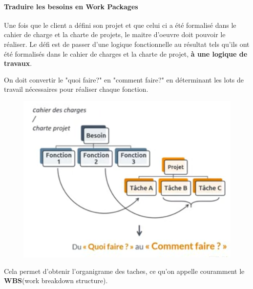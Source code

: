 \paragraph*{Traduire les besoins en Work Packages}
Une fois que le client a défini son projet et que celui ci a été formalisé dans le cahier de charge et la charte de projets, le maitre d'oeuvre doit pouvoir le réaliser. Le défi est de passer d'une logique fonctionnelle au résultat tels qu'ils ont été formalisés dans le cahier de charges et la charte de projet, \textbf{à une logique de travaux}.

On doit convertir le "quoi faire?" en "comment faire?" en déterminant les lots de travail nécessaires pour réaliser chaque fonction.
\begin{figure}[!h]
	\begin{center}
		\includegraphics[scale=0.2]{images/lots.png}
	\end{center}
\end{figure}
Cela permet d'obtenir l'organigrame des taches, ce qu'on appelle couramment le \textbf{WBS}(work breakdown structure).\\

